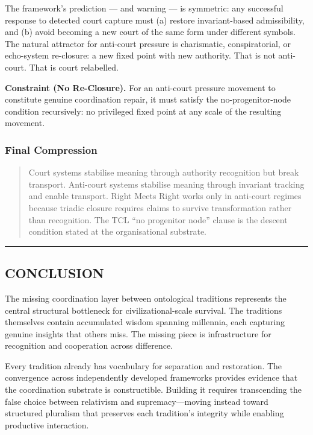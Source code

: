 \documentclass[
]{article}
\begin{document}
The framework's prediction --- and warning --- is symmetric: any
successful response to detected court capture must (a) restore
invariant-based admissibility, and (b) avoid becoming a new court
of the same form under different symbols. The natural attractor
for anti-court pressure is charismatic, conspiratorial, or
echo-system re-closure: a new fixed point with new authority.
That is not anti-court. That is court relabelled.

\textbf{Constraint (No Re-Closure).} For an anti-court pressure
movement to constitute genuine coordination repair, it must
satisfy the no-progenitor-node condition recursively: no
privileged fixed point at any scale of the resulting movement.

\subsubsection{Final Compression}\label{final-compression-court}

\begin{quote}
Court systems stabilise meaning through authority recognition but
break transport. Anti-court systems stabilise meaning through
invariant tracking and enable transport. Right Meets Right works
only in anti-court regimes because triadic closure requires claims
to survive transformation rather than recognition. The TCL
``no progenitor node'' clause is the descent condition stated at
the organisational substrate.
\end{quote}

\begin{center}\rule{0.5\linewidth}{0.5pt}\end{center}

\subsection{CONCLUSION}\label{conclusion-1}

The missing coordination layer between ontological traditions represents
the central structural bottleneck for civilizational-scale survival. The
traditions themselves contain accumulated wisdom spanning millennia,
each capturing genuine insights that others miss. The missing piece is
infrastructure for recognition and cooperation across difference.

Every tradition already has vocabulary for separation and restoration.
The convergence across independently developed frameworks provides
evidence that the coordination substrate is constructible. Building it
requires transcending the false choice between relativism and
supremacy---moving instead toward structured pluralism that preserves
each tradition's integrity while enabling productive interaction.
\end{document}
